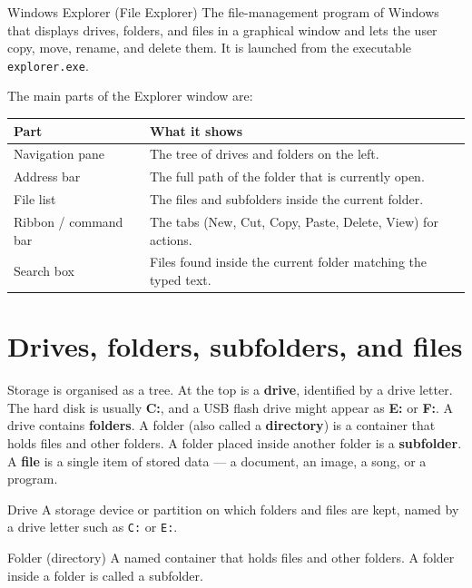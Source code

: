 \begin{definitionbox}{Windows Explorer (File Explorer)}
The file-management program of Windows that displays drives, folders, and
files in a graphical window and lets the user copy, move, rename, and delete
them. It is launched from the executable \texttt{explorer.exe}.
\end{definitionbox}

The main parts of the Explorer window are:
\begin{center}
\begin{tabular}{p{}p{}}
\toprule
\textbf{Part} & \textbf{What it shows} \\
\midrule
Navigation pane & The tree of drives and folders on the left. \\
Address bar & The full path of the folder that is currently open. \\
File list & The files and subfolders inside the current folder. \\
Ribbon / command bar & The tabs (New, Cut, Copy, Paste, Delete, View) for actions. \\
Search box & Files found inside the current folder matching the typed text. \\
\bottomrule
\end{tabular}
\end{center}

\section{Drives, folders, subfolders, and files}
Storage is organised as a tree. At the top is a \textbf{drive}, identified by
a drive letter. The hard disk is usually \textbf{C:}, and a USB flash drive
might appear as \textbf{E:} or \textbf{F:}. A drive contains
\textbf{folders}. A folder (also called a \textbf{directory}) is a container
that holds files and other folders. A folder placed inside another folder is
a \textbf{subfolder}. A \textbf{file} is a single item of stored data --- a
document, an image, a song, or a program.

\begin{definitionbox}{Drive}
A storage device or partition on which folders and files are kept, named by
a drive letter such as \texttt{C:} or \texttt{E:}.
\end{definitionbox}

\begin{definitionbox}{Folder (directory)}
A named container that holds files and other folders. A folder inside a
folder is called a subfolder.
\end{definitionbox}

